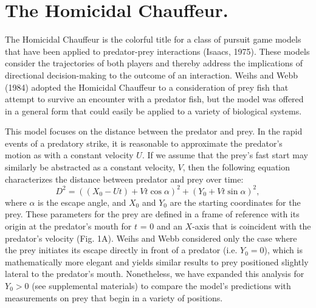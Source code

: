 \documentclass[12pt]{article}
\begin{document}
\section{The Homicidal Chauffeur.}

The Homicidal Chauffeur is the colorful title for a class of pursuit game models that have been applied to predator-prey interactions (Isaacs, 1975). These models consider the trajectories of both players and thereby address the implications of directional decision-making to the outcome of an interaction. Weihs and Webb (1984) adopted the Homicidal Chauffeur to a consideration of prey fish that attempt to survive an encounter with a predator fish, but the model was offered in a general form that could easily be applied to a variety of biological systems. 

This model focuses on the distance between the predator and prey. In the rapid events of a predatory strike, it is reasonable to approximate the predator's motion as with a constant velocity $U$. If we assume that the prey's fast start may similarly be abstracted as a constant velocity, $V$, then the following equation characterizes the distance between predator and prey over time:
%
\begin{equation}
D^2 = ((X_0 - Ut) + Vt\cos\alpha)^2 + (Y_0  + Vt\sin\alpha)^2,
\label{dist}
\end{equation}
%
where $\alpha$ is the escape angle, and $X_0$ and  $Y_0$ are the starting coordinates for the prey. These parameters for the prey are defined in a frame of reference with its origin at the predator's mouth for $t$ = 0 and an $X$-axis that is coincident with the predator's velocity (Fig. 1A). Weihs and Webb considered only the case where the prey initiates its escape directly in front of a predator (i.e. $Y_0=0$), which is mathematically more elegant and yields similar results to prey positioned slightly lateral to the predator's mouth. Nonetheless, we have expanded this analysis for $Y_0>0$ (see supplemental materials) to compare the model's predictions with measurements on prey that begin in a variety of positions.
\end{document}

